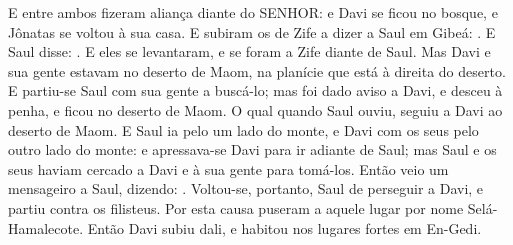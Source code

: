 {  E entre ambos fizeram aliança diante do SENHOR: e Davi se ficou no bosque, e Jônatas se voltou à sua casa.
  E subiram os de Zife a dizer a Saul em Gibeá: .
  E Saul disse: .
  E eles se levantaram, e se foram a Zife diante de Saul. Mas Davi e sua gente estavam no deserto de Maom, na planície que está à direita do deserto.
  E partiu-se Saul com sua gente a buscá-lo; mas foi dado aviso a Davi, e desceu à penha, e ficou no deserto de Maom. O qual quando Saul ouviu, seguiu a Davi ao deserto de Maom.
  E Saul ia pelo um lado do monte, e Davi com os seus pelo outro lado do monte: e apressava-se Davi para ir adiante de Saul; mas Saul e os seus haviam cercado a Davi e à sua gente para tomá-los.
  Então veio um mensageiro a Saul, dizendo: .
  Voltou-se, portanto, Saul de perseguir a Davi, e partiu contra os filisteus. Por esta causa puseram a aquele lugar por nome Selá-Hamalecote.
  Então Davi subiu dali, e habitou nos lugares fortes em En-Gedi.
\par }

